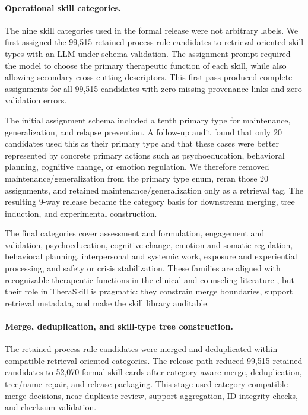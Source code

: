 \documentclass[11pt]{article}
\begin{document}
\paragraph{Operational skill categories.}
The nine skill categories used in the formal release were not arbitrary labels. We first assigned the 99,515 retained process-rule candidates to retrieval-oriented skill types with an LLM under schema validation. The assignment prompt required the model to choose the primary therapeutic function of each skill, while also allowing secondary cross-cutting descriptors. This first pass produced complete assignments for all 99,515 candidates with zero missing provenance links and zero validation errors.

The initial assignment schema included a tenth primary type for maintenance, generalization, and relapse prevention. A follow-up audit found that only 20 candidates used this as their primary type and that these cases were better represented by concrete primary actions such as psychoeducation, behavioral planning, cognitive change, or emotion regulation. We therefore removed maintenance/generalization from the primary type enum, reran those 20 assignments, and retained maintenance/generalization only as a retrieval tag. The resulting 9-way release became the category basis for downstream merging, tree induction, and experimental construction.

The final categories cover assessment and formulation, engagement and validation, psychoeducation, cognitive change, emotion and somatic regulation, behavioral planning, interpersonal and systemic work, exposure and experiential processing, and safety or crisis stabilization. These families are aligned with recognizable therapeutic functions in the clinical and counseling literature \citep{bordin1979alliance,lukens2004psychoeducation,beck1979cognitive,jacobson2001behavioral,gross1998emotion,klerman1984ipt,foa1986exposure,stanley2012safety}, but their role in TheraSkill is pragmatic: they constrain merge boundaries, support retrieval metadata, and make the skill library auditable.

\paragraph{Merge, deduplication, and skill-type tree construction.}
The retained process-rule candidates were merged and deduplicated within compatible retrieval-oriented categories. The release path reduced 99,515 retained candidates to 52,070 formal skill cards after category-aware merge, deduplication, tree/name repair, and release packaging. This stage used category-compatible merge decisions, near-duplicate review, support aggregation, ID integrity checks, and checksum validation.
\end{document}

